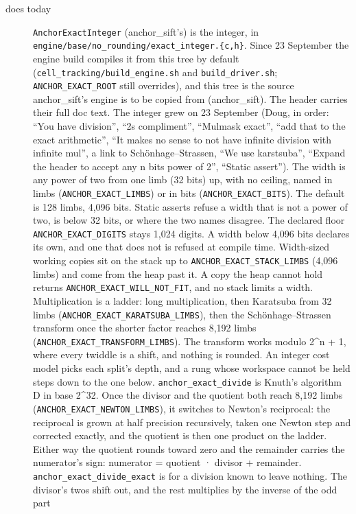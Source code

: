 \begin{description}
\item[{does today}] \texttt{Anchor\allowbreak{}Exact\allowbreak{}Integer} (anchor\_\allowbreak{}sift's) is the integer, in \texttt{engine/\allowbreak{}base/\allowbreak{}no\_\allowbreak{}rounding/\allowbreak{}exact\_\allowbreak{}integer.\allowbreak{}\{c,h\}}. Since 23 September the engine build compiles it from this tree by default (\texttt{cell\_\allowbreak{}tracking/\allowbreak{}build\_\allowbreak{}engine.\allowbreak{}sh} and \texttt{build\_\allowbreak{}driver.\allowbreak{}sh}; \texttt{ANCHOR\_\allowbreak{}EXACT\_\allowbreak{}ROOT} still overrides), and this tree is the source anchor\_\allowbreak{}sift's engine is to be copied from (anchor\_\allowbreak{}sift). The header carries their full doc text. The integer grew on 23 September (Doug, in order: “You have division”, “2s compliment”, “Mulmask exact”, “add that to the exact arithmetic”, “It makes no sense to not have infinite division with infinite mul”, a link to Schönhage–Strassen, “We use karstsuba”, “Expand the header to accept any n bits power of 2”, “Static assert”). The width is any power of two from one limb (32 bits) up, with no ceiling, named in limbs (\texttt{ANCHOR\_\allowbreak{}EXACT\_\allowbreak{}LIMBS}) or in bits (\texttt{ANCHOR\_\allowbreak{}EXACT\_\allowbreak{}BITS}). The default is 128 limbs, 4,096 bits. Static asserts refuse a width that is not a power of two, is below 32 bits, or where the two names disagree. The declared floor \texttt{ANCHOR\_\allowbreak{}EXACT\_\allowbreak{}DIGITS} stays 1,024 digits. A width below 4,096 bits declares its own, and one that does not is refused at compile time. Width-sized working copies sit on the stack up to \texttt{ANCHOR\_\allowbreak{}EXACT\_\allowbreak{}STACK\_\allowbreak{}LIMBS} (4,096 limbs) and come from the heap past it. A copy the heap cannot hold returns \texttt{ANCHOR\_\allowbreak{}EXACT\_\allowbreak{}WILL\_\allowbreak{}NOT\_\allowbreak{}FIT}, and no stack limits a width. Multiplication is a ladder: long multiplication, then Karatsuba from 32 limbs (\texttt{ANCHOR\_\allowbreak{}EXACT\_\allowbreak{}KARATSUBA\_\allowbreak{}LIMBS}), then the Schönhage–Strassen transform once the shorter factor reaches 8,192 limbs (\texttt{ANCHOR\_\allowbreak{}EXACT\_\allowbreak{}TRANSFORM\_\allowbreak{}LIMBS}). The transform works modulo 2\textasciicircum{}n + 1, where every twiddle is a shift, and nothing is rounded. An integer cost model picks each split's depth, and a rung whose workspace cannot be held steps down to the one below. \texttt{anchor\_\allowbreak{}exact\_\allowbreak{}divide} is Knuth's algorithm D in base 2\textasciicircum{}32. Once the divisor and the quotient both reach 8,192 limbs (\texttt{ANCHOR\_\allowbreak{}EXACT\_\allowbreak{}NEWTON\_\allowbreak{}LIMBS}), it switches to Newton's reciprocal: the reciprocal is grown at half precision recursively, taken one Newton step and corrected exactly, and the quotient is then one product on the ladder. Either way the quotient rounds toward zero and the remainder carries the numerator's sign: numerator = quotient · divisor + remainder. \texttt{anchor\_\allowbreak{}exact\_\allowbreak{}divide\_\allowbreak{}exact} is for a division known to leave nothing. The divisor's twos shift out, and the rest multiplies by the inverse of the odd part 
\end{description}
